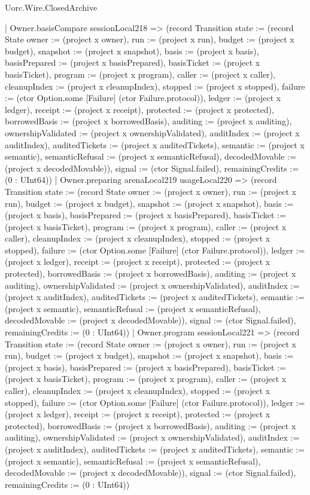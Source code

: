 \begin{lexlean}{Uorc.Wire.ClosedArchive}
\begin{semanticmodule}
{    | Owner.basisCompare sessionLocal218 => (record Transition {state := (record State {owner := (project x owner), run := (project x run), budget := (project x budget), snapshot := (project x snapshot), basis := (project x basis), basisPrepared := (project x basisPrepared), basisTicket := (project x basisTicket), program := (project x program), caller := (project x caller), cleanupIndex := (project x cleanupIndex), stopped := (project x stopped), failure := (ctor Option.some [Failure] (ctor Failure.protocol)), ledger := (project x ledger), receipt := (project x receipt), protected := (project x protected), borrowedBasis := (project x borrowedBasis), auditing := (project x auditing), ownershipValidated := (project x ownershipValidated), auditIndex := (project x auditIndex), auditedTickets := (project x auditedTickets), semantic := (project x semantic), semanticRefusal := (project x semanticRefusal), decodedMovable := (project x decodedMovable)}), signal := (ctor Signal.failed), remainingCredits := (0 : UInt64)})
    | Owner.preparing arenaLocal219 usageLocal220 => (record Transition {state := (record State {owner := (project x owner), run := (project x run), budget := (project x budget), snapshot := (project x snapshot), basis := (project x basis), basisPrepared := (project x basisPrepared), basisTicket := (project x basisTicket), program := (project x program), caller := (project x caller), cleanupIndex := (project x cleanupIndex), stopped := (project x stopped), failure := (ctor Option.some [Failure] (ctor Failure.protocol)), ledger := (project x ledger), receipt := (project x receipt), protected := (project x protected), borrowedBasis := (project x borrowedBasis), auditing := (project x auditing), ownershipValidated := (project x ownershipValidated), auditIndex := (project x auditIndex), auditedTickets := (project x auditedTickets), semantic := (project x semantic), semanticRefusal := (project x semanticRefusal), decodedMovable := (project x decodedMovable)}), signal := (ctor Signal.failed), remainingCredits := (0 : UInt64)})
    | Owner.program sessionLocal221 => (record Transition {state := (record State {owner := (project x owner), run := (project x run), budget := (project x budget), snapshot := (project x snapshot), basis := (project x basis), basisPrepared := (project x basisPrepared), basisTicket := (project x basisTicket), program := (project x program), caller := (project x caller), cleanupIndex := (project x cleanupIndex), stopped := (project x stopped), failure := (ctor Option.some [Failure] (ctor Failure.protocol)), ledger := (project x ledger), receipt := (project x receipt), protected := (project x protected), borrowedBasis := (project x borrowedBasis), auditing := (project x auditing), ownershipValidated := (project x ownershipValidated), auditIndex := (project x auditIndex), auditedTickets := (project x auditedTickets), semantic := (project x semantic), semanticRefusal := (project x semanticRefusal), decodedMovable := (project x decodedMovable)}), signal := (ctor Signal.failed), remainingCredits := (0 : UInt64)})
}
\end{semanticmodule}
\end{lexlean}
